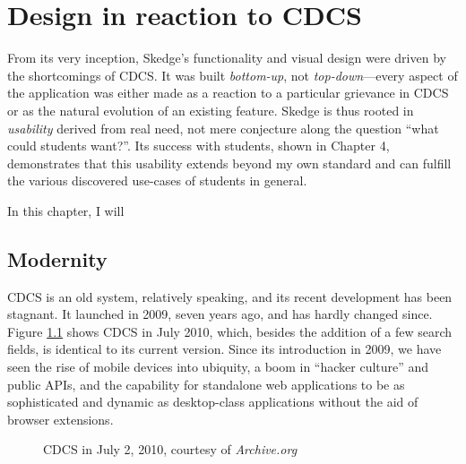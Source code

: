 
\chapter{Design in reaction to CDCS}

From its very inception, Skedge's functionality and visual design were driven by the shortcomings of CDCS. It was built \emph{bottom-up}, not \emph{top-down}---every aspect of the application was either made as a reaction to a particular grievance in CDCS or as the natural evolution of an existing feature. Skedge is thus rooted in \emph{usability} derived from real need, not mere conjecture along the question ``what could students want?''. Its success with students, shown in Chapter 4, demonstrates that this usability extends beyond my own standard and can fulfill the various discovered use-cases of students in general.

In this chapter, I will


\section{Modernity}

CDCS is an old system, relatively speaking, and its recent development has been stagnant. It launched in 2009, seven years ago, and has hardly changed since. Figure \ref{fig:cdcs2010} shows CDCS in July 2010, which, besides the addition of a few search fields, is identical to its current version. Since its introduction in 2009, we have seen the rise of mobile devices into ubiquity, a boom in ``hacker culture'' and public APIs, and the capability for standalone web applications to be as sophisticated and dynamic as desktop-class applications without the aid of browser extensions.

\begin{figure}[ht]
  \centering
  \caption{CDCS in July 2, 2010, courtesy of \emph{Archive.org}}
  \label{fig:cdcs2010}
\end{figure}

